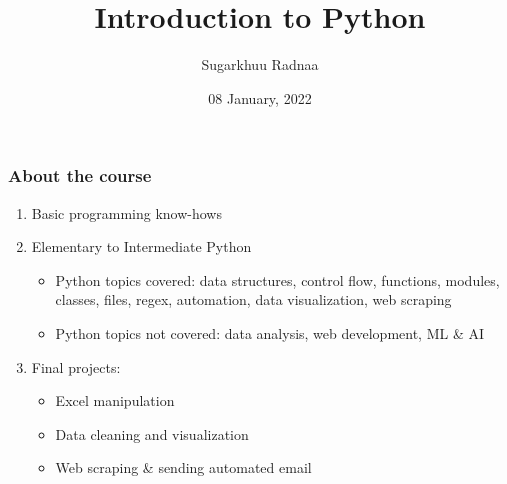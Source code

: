 \documentclass{beamer}
\title[Python Intro]{Introduction to Python} %
\author{Sugarkhuu Radnaa} %
\institute[] %
{
Py4Econ in Ulaanbaatar \\ %
\medskip
\textit{py4econ@gmail.com} %
}
\date{08 January, 2022}  %
\begin{document}
\begin{frame}
\titlepage %
\end{frame}

\begin{frame}
\frametitle{About the course} %
\begin{enumerate}
    \item Basic programming know-hows
    \item Elementary to Intermediate Python
        \begin{itemize}
            \item Python topics covered: data structures, control flow, functions, modules, classes, files, regex, automation, data visualization, web scraping
            \item Python topics not covered: data analysis, web development, ML \& AI
        \end{itemize}
    \item Final projects:
        \begin{itemize}
            \item Excel manipulation 
            \item Data cleaning and visualization 
            \item Web scraping \& sending automated email
        \end{itemize}
\end{enumerate}
\end{frame}
\end{document}
